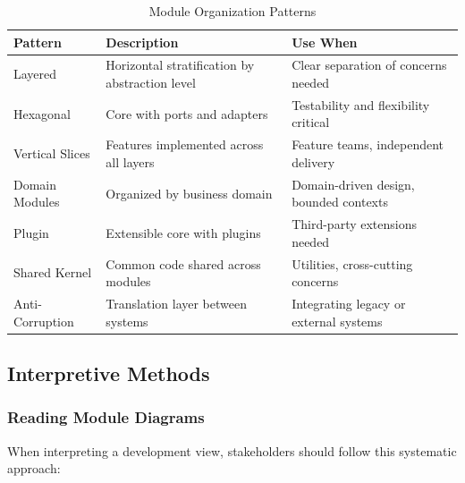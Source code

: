 \documentclass[11pt,letterpaper]{article}
\begin{document}
\begin{table}[H]
\centering
\caption{Module Organization Patterns}
\small
\begin{tabular}{@{}L{2.8cm}L{5cm}L{5.5cm}@{}}
\toprule
\textbf{Pattern} & \textbf{Description} & \textbf{Use When} \\
\midrule
Layered & Horizontal stratification by abstraction level & Clear separation of concerns needed \\
\addlinespace
Hexagonal & Core with ports and adapters & Testability and flexibility critical \\
\addlinespace
Vertical Slices & Features implemented across all layers & Feature teams, independent delivery \\
\addlinespace
Domain Modules & Organized by business domain & Domain-driven design, bounded contexts \\
\addlinespace
Plugin & Extensible core with plugins & Third-party extensions needed \\
\addlinespace
Shared Kernel & Common code shared across modules & Utilities, cross-cutting concerns \\
\addlinespace
Anti-Corruption & Translation layer between systems & Integrating legacy or external systems \\
\bottomrule
\end{tabular}
\end{table}

\subsection{Interpretive Methods}

\subsubsection{Reading Module Diagrams}

When interpreting a development view, stakeholders should follow this systematic approach:
\end{document}
